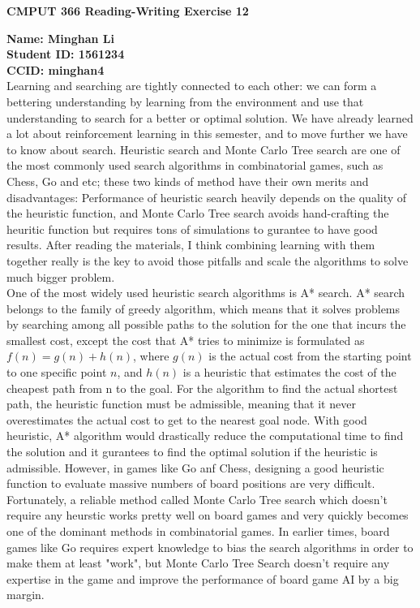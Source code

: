 \documentclass[12pt,a4paper]{article}
\begin{document}
\centerline{\large{\textbf{CMPUT 366 Reading-Writing Exercise 12}}}

\noindent \textbf{Name: Minghan Li}\\
\textbf{Student ID: 1561234}\\
\textbf{CCID: minghan4}\\

Learning and searching are tightly connected to each other: we can form a bettering understanding by learning from the environment and use that understanding to search for a better or optimal solution. We have already learned a lot about reinforcement learning in this semester, and to move further we have to know about search. Heuristic search and Monte Carlo Tree search are one of the most commonly used search algorithms in combinatorial games, such as Chess, Go and etc; these two kinds of method have their own merits and disadvantages: Performance of heuristic search heavily depends on the quality of the heuristic function, and Monte Carlo Tree search avoids hand-crafting the heuritic function but requires tons of simulations to gurantee to have good results. After reading the materials, I think combining learning with them together really is the key to avoid those pitfalls and scale the algorithms to solve much bigger problem.\\

One of the most widely used heuristic search algorithms is A* search. A* search belongs to the family of greedy algorithm, which means that it solves problems by searching among all possible paths to the solution for the one that incurs the smallest cost, except the cost that A* tries to minimize is formulated as $f(n)=g(n)+h(n)$, where $g(n)$ is the actual cost from the starting point to one specific point $n$, and $h(n)$ is a heuristic that estimates the cost of the cheapest path from n to the goal. For the algorithm to find the actual shortest path, the heuristic function must be admissible, meaning that it never overestimates the actual cost to get to the nearest goal node. With good heuristic, A* algorithm would drastically reduce the computational time to find the solution and it gurantees to find the optimal solution if the heuristic is admissible. However, in games like Go anf Chess, designing a good heuristic function to evaluate massive numbers of board positions are very difficult. Fortunately, a reliable method called Monte Carlo Tree search which doesn't require any heurstic works pretty well on board games and very quickly becomes one of the dominant methods in combinatorial games. In earlier times, board games like Go requires expert knowledge to bias the search algorithms in order to make them at least "work", but Monte Carlo Tree Search doesn't require any expertise in the game and improve the performance of board game AI by a big margin.\\
\end{document}
